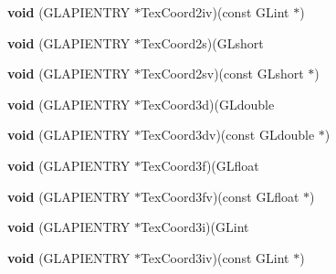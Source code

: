 \begin{DoxyCompactItemize}
\item 
\mbox{\label{struct_____g_ldispatch_table_rec_a952ba687d9101a0521bb8778496f8d55}} 
{\bfseries void} (G\+L\+A\+P\+I\+E\+N\+T\+RY $\ast$Tex\+Coord2iv)(const G\+Lint $\ast$)
\item 
\mbox{\label{struct_____g_ldispatch_table_rec_a61fd177d8824a783268ae88de31e2d35}} 
{\bfseries void} (G\+L\+A\+P\+I\+E\+N\+T\+RY $\ast$Tex\+Coord2s)(G\+Lshort
\item 
\mbox{\label{struct_____g_ldispatch_table_rec_a44def333463824dd029b7c5c5248eb56}} 
{\bfseries void} (G\+L\+A\+P\+I\+E\+N\+T\+RY $\ast$Tex\+Coord2sv)(const G\+Lshort $\ast$)
\item 
\mbox{\label{struct_____g_ldispatch_table_rec_aa671f331ce79a8b0ce8c019eacddbae3}} 
{\bfseries void} (G\+L\+A\+P\+I\+E\+N\+T\+RY $\ast$Tex\+Coord3d)(G\+Ldouble
\item 
\mbox{\label{struct_____g_ldispatch_table_rec_abd8f5026672129124674560665490f03}} 
{\bfseries void} (G\+L\+A\+P\+I\+E\+N\+T\+RY $\ast$Tex\+Coord3dv)(const G\+Ldouble $\ast$)
\item 
\mbox{\label{struct_____g_ldispatch_table_rec_a1125c3583622e94c21b6ac9ff2145305}} 
{\bfseries void} (G\+L\+A\+P\+I\+E\+N\+T\+RY $\ast$Tex\+Coord3f)(G\+Lfloat
\item 
\mbox{\label{struct_____g_ldispatch_table_rec_ad0d60274b19958c93b06fa6215b4ac7f}} 
{\bfseries void} (G\+L\+A\+P\+I\+E\+N\+T\+RY $\ast$Tex\+Coord3fv)(const G\+Lfloat $\ast$)
\item 
\mbox{\label{struct_____g_ldispatch_table_rec_a4bfea2a77dcc0ebbf560bca84298e3dc}} 
{\bfseries void} (G\+L\+A\+P\+I\+E\+N\+T\+RY $\ast$Tex\+Coord3i)(G\+Lint
\item 
\mbox{\label{struct_____g_ldispatch_table_rec_ad71b27323db66a76b95c9b95f69b8bf3}} 
{\bfseries void} (G\+L\+A\+P\+I\+E\+N\+T\+RY $\ast$Tex\+Coord3iv)(const G\+Lint $\ast$)

\end{DoxyCompactItemize}
